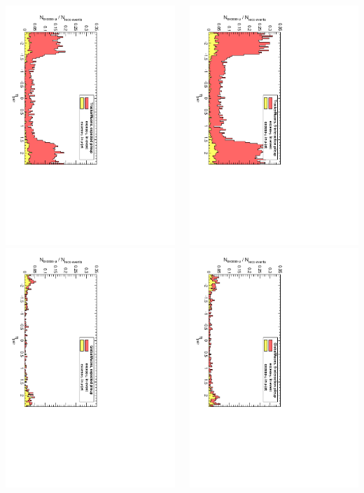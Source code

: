 \documentclass[compress]{beamer}
\begin{document}
\begin{frame}
\begin{columns}
\includegraphics[height=0.5\linewidth, angle=90]{toomanymuons_TrackerMuonsGroupByMassAndVertexProbOrDeltaR_pileup.pdf}
\includegraphics[height=0.5\linewidth, angle=90]{toomanymuons_GlobalMuonsGroupByMassAndVertexProbOrDeltaR_pileup.pdf}

\includegraphics[height=0.5\linewidth, angle=90]{toomanymuons_TrackerMuonsGroupByMassAndVertexProbOrDeltaR_pileup5.pdf}
\includegraphics[height=0.5\linewidth, angle=90]{toomanymuons_GlobalMuonsGroupByMassAndVertexProbOrDeltaR_pileup5.pdf}


\end{columns}
\end{frame}
\end{document}
